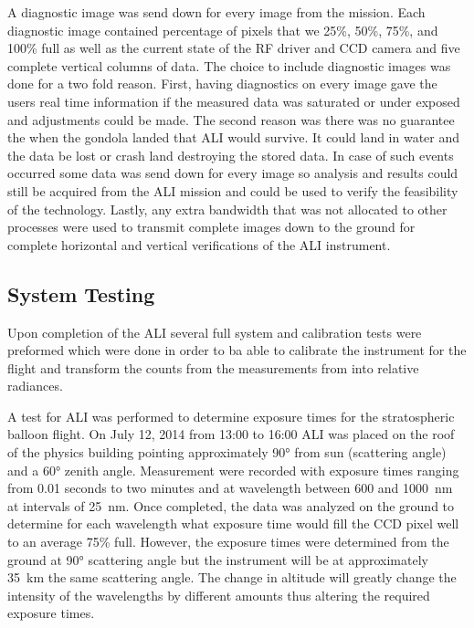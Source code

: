 A diagnostic image was send down for every image from the mission. Each diagnostic image contained percentage of pixels that we 25\%, 50\%, 75\%, and 100\% full as well as the current state of the RF driver and CCD camera and five complete vertical columns of data. The choice to include diagnostic images was done for a two fold reason. First, having diagnostics on every image gave the users real time information if the measured data was saturated or under exposed and adjustments could be made. The second reason was there was no guarantee the when the gondola landed that ALI would survive. It could land in water and the data be lost or crash land destroying the stored data. In case of such events occurred some data was send down for every image so analysis and results could still be acquired from the ALI mission and could be used to verify the feasibility of the technology. Lastly, any extra bandwidth that was not allocated to other processes were used to transmit complete images down to the ground for complete horizontal and vertical verifications of the ALI instrument.

\subsection{System Testing}
\label{sec:3.3:SystemTesting}

Upon completion of the ALI several full system and calibration tests were preformed which were done in order to ba able to calibrate the instrument for the flight and transform the counts from the measurements from into relative radiances.

A test for ALI was performed to determine exposure times for the stratospheric balloon flight. On July 12, 2014 from 13:00 to 16:00 ALI was placed on the roof of the physics building pointing approximately 90\si{\degree} from sun (scattering angle) and a 60\si{\degree} zenith angle. Measurement were recorded with exposure times ranging from 0.01 seconds to two minutes and at wavelength between 600 and 1000~nm at intervals of 25~nm. Once completed, the data was analyzed on the ground to determine for each wavelength what exposure time would fill the CCD pixel well to an average 75\% full. However, the exposure times were determined from the ground at 90\si{\degree} scattering angle but the instrument will be at approximately 35~km the same scattering angle. The change in altitude will greatly change the intensity of the wavelengths by different amounts thus altering the required exposure times.

